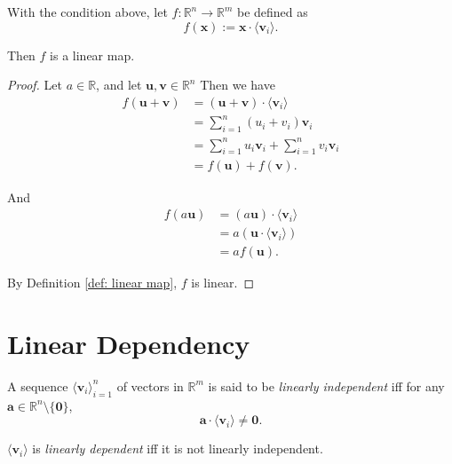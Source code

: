 \begin{lemma}
	\label{lm: span: is linear map}
	With the condition above, let $f: \mathbb R^n \to \mathbb R^m$ be defined as
	$$
	f(\mathbf x) := \mathbf x \cdot \langle \mathbf v_i \rangle.
	$$
	
	Then $f$ is a linear map.
	
	\begin{proof}
		Let $a \in \mathbb R$, and let $\mathbf u, \mathbf v \in \mathbb R^n$ Then we have
		$$
		\begin{aligned}
			f(\mathbf u + \mathbf v) &= (\mathbf u + \mathbf v) \cdot \langle \mathbf v_i \rangle \\
			&= \sum_{i = 1}^n (u_i + v_i) \mathbf v_i \\
			&= \sum_{i = 1}^n u_i \mathbf v_i + \sum_{i = 1}^n v_i \mathbf v_i \\
			&= f(\mathbf u) + f(\mathbf v).
		\end{aligned}
		$$
		
		And
		$$
		\begin{aligned}
			f(a\mathbf u) &= (a \mathbf u) \cdot \langle \mathbf v_i \rangle \\
			&= a (\mathbf u \cdot \langle \mathbf v_i \rangle) \\
			&= af(\mathbf u).
		\end{aligned}
		$$
		
		By Definition \ref{def: linear map}, $f$ is linear.
	\end{proof}
\end{lemma}





\section{Linear Dependency}



\begin{definition}
	\label{def: linear dependency}	
	A sequence $\langle\mathbf v_i\rangle_{i = 1}^{n}$ of vectors in $\mathbb R^m$ is said to be \textit{linearly independent} iff for any $\mathbf a \in \mathbb R^n \setminus \{\mathbf 0\}$,
	$$
	\mathbf a \cdot \langle\mathbf v_i\rangle \ne \mathbf 0.
	$$
	
	$\langle\mathbf v_i\rangle$ is \textit{linearly dependent} iff it is not linearly independent.
\end{definition}



